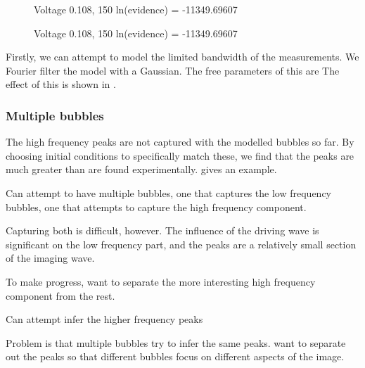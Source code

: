 \begin{figure}[t]%
  \centering
  \subfloat[1st pulse - 1000]{
    \label{fig:plot_bubble_fit_108_150_filter_a:first}
    }
\caption{Voltage 0.108, 150 ln(evidence) = -11349.69607 }
\end{figure}

\begin{figure}[t]%
  \centering
  \subfloat[1st pulse - 1000]{
    \label{fig:plot_bubble_fit_108_150_filter_a:first}
    }
\caption{Voltage 0.108, 150 ln(evidence) = -11349.69607 }
\end{figure}



Firstly,
we can attempt to model the limited bandwidth of the measurements.
We Fourier filter the model with a Gaussian.
The free parameters of this are
The effect of this is shown in \figref{}.



\subsubsection{Multiple bubbles}

The high frequency peaks are not captured with the modelled bubbles so far.
By choosing initial conditions to specifically match these,
we find that the peaks are much greater than are found experimentally.
\Figref{} gives an example.

Can attempt to have multiple bubbles,
one that captures the low frequency bubbles,
one that attempts to capture the high frequency component.

Capturing both is difficult, however. 
The influence of the driving wave is significant on the low frequency part,
and the peaks are a relatively small section of the imaging wave.

To make progress, want to separate the more interesting high frequency component 
from the rest.

Can attempt infer the higher frequency peaks

Problem is that multiple bubbles try to infer the same peaks.
want to separate out the peaks so that different bubbles focus on different aspects
of the image.



